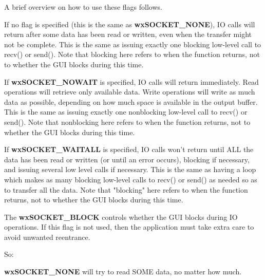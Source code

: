\label{wxsocketbasesetflags}


\twocolwidtha{7cm}
\begin{twocollist}\itemsep=0pt
\end{twocollist}

A brief overview on how to use these flags follows.

If no flag is specified (this is the same as {\bf wxSOCKET\_NONE}),
IO calls will return after some data has been read or written, even
when the transfer might not be complete. This is the same as issuing
exactly one blocking low-level call to recv() or send(). Note that
blocking here refers to when the function returns, not to whether
the GUI blocks during this time.

If {\bf wxSOCKET\_NOWAIT} is specified, IO calls will return immediately.
Read operations will retrieve only available data. Write operations will
write as much data as possible, depending on how much space is available
in the output buffer. This is the same as issuing exactly one nonblocking
low-level call to recv() or send(). Note that nonblocking here refers to
when the function returns, not to whether the GUI blocks during this time.

If {\bf wxSOCKET\_WAITALL} is specified, IO calls won't return until ALL
the data has been read or written (or until an error occurs), blocking if
necessary, and issuing several low level calls if necessary. This is the
same as having a loop which makes as many blocking low-level calls to
recv() or send() as needed so as to transfer all the data. Note that
"blocking" here refers to when the function returns, not to whether
the GUI blocks during this time.

The {\bf wxSOCKET\_BLOCK} controls whether the GUI blocks during IO
operations. If this flag is not used, then the application must take
extra care to avoid unwanted reentrance. 

So:

{\bf wxSOCKET\_NONE} will try to read SOME data, no matter how much.

